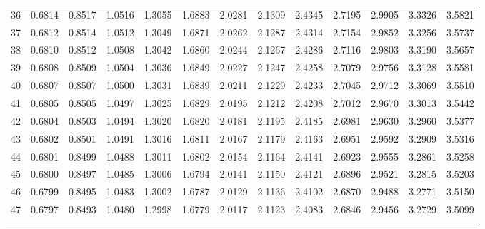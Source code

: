 {\begin{tabular}{m{6pt}|m{24pt}*{11}{m{24pt}}}
 36 & 0.6814 & 0.8517 & 1.0516 & 1.3055 & 1.6883 & 2.0281 & 2.1309 & 2.4345 & 2.7195 & 2.9905 & 3.3326 & 3.5821 \\[1pt] \arrayrulecolor{light-gray}\hline\arrayrulecolor{black}  
 37 & 0.6812 & 0.8514 & 1.0512 & 1.3049 & 1.6871 & 2.0262 & 2.1287 & 2.4314 & 2.7154 & 2.9852 & 3.3256 & 3.5737 \\[1pt] \arrayrulecolor{light-gray}\hline\arrayrulecolor{black}  
 38 & 0.6810 & 0.8512 & 1.0508 & 1.3042 & 1.6860 & 2.0244 & 2.1267 & 2.4286 & 2.7116 & 2.9803 & 3.3190 & 3.5657 \\[1pt] \arrayrulecolor{light-gray}\hline\arrayrulecolor{black}  
 39 & 0.6808 & 0.8509 & 1.0504 & 1.3036 & 1.6849 & 2.0227 & 2.1247 & 2.4258 & 2.7079 & 2.9756 & 3.3128 & 3.5581 \\[1pt] \arrayrulecolor{light-gray}\hline\arrayrulecolor{black}  
 40 & 0.6807 & 0.8507 & 1.0500 & 1.3031 & 1.6839 & 2.0211 & 2.1229 & 2.4233 & 2.7045 & 2.9712 & 3.3069 & 3.5510 \\[1pt] \arrayrulecolor{light-gray}\hline\arrayrulecolor{black}  
 41 & 0.6805 & 0.8505 & 1.0497 & 1.3025 & 1.6829 & 2.0195 & 2.1212 & 2.4208 & 2.7012 & 2.9670 & 3.3013 & 3.5442 \\[1pt] \arrayrulecolor{light-gray}\hline\arrayrulecolor{black}  
 42 & 0.6804 & 0.8503 & 1.0494 & 1.3020 & 1.6820 & 2.0181 & 2.1195 & 2.4185 & 2.6981 & 2.9630 & 3.2960 & 3.5377 \\[1pt] \arrayrulecolor{light-gray}\hline\arrayrulecolor{black}  
 43 & 0.6802 & 0.8501 & 1.0491 & 1.3016 & 1.6811 & 2.0167 & 2.1179 & 2.4163 & 2.6951 & 2.9592 & 3.2909 & 3.5316 \\[1pt] \arrayrulecolor{light-gray}\hline\arrayrulecolor{black}  
 44 & 0.6801 & 0.8499 & 1.0488 & 1.3011 & 1.6802 & 2.0154 & 2.1164 & 2.4141 & 2.6923 & 2.9555 & 3.2861 & 3.5258 \\[1pt] \arrayrulecolor{light-gray}\hline\arrayrulecolor{black}  
 45 & 0.6800 & 0.8497 & 1.0485 & 1.3006 & 1.6794 & 2.0141 & 2.1150 & 2.4121 & 2.6896 & 2.9521 & 3.2815 & 3.5203 \\[1pt] \arrayrulecolor{light-gray}\hline\arrayrulecolor{black}  
 46 & 0.6799 & 0.8495 & 1.0483 & 1.3002 & 1.6787 & 2.0129 & 2.1136 & 2.4102 & 2.6870 & 2.9488 & 3.2771 & 3.5150 \\[1pt] \arrayrulecolor{light-gray}\hline\arrayrulecolor{black}  
 47 & 0.6797 & 0.8493 & 1.0480 & 1.2998 & 1.6779 & 2.0117 & 2.1123 & 2.4083 & 2.6846 & 2.9456 & 3.2729 & 3.5099 \\[1pt] \arrayrulecolor{light-gray}\hline\arrayrulecolor{black}  

\end{tabular}}
